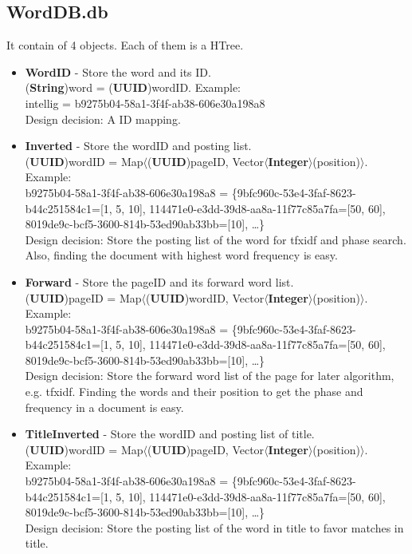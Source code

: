 \documentclass{article}
\begin{document}
    \subsection*{WordDB.db}
    It contain of 4 objects. Each of them is a HTree.
    \begin{itemize}
        \item \textbf{WordID} - Store the word and its ID. \\[0.4em]
        (\textbf{String})word = (\textbf{UUID})wordID. Example:\\[0.4em]
        intellig = b9275b04-58a1-3f4f-ab38-606e30a198a8 \\[0.4em]
        Design decision: A ID mapping.
        \item \textbf{Inverted} - Store the wordID and posting list. \\[0.4em]
        (\textbf{UUID})wordID = Map$\langle$(\textbf{UUID})pageID, Vector$\langle$\textbf{Integer}$\rangle$(position)$\rangle$.
        Example:\\[0.4em]
        b9275b04-58a1-3f4f-ab38-606e30a198a8 = \{9bfc960c-53e4-3faf-8623-b44c251584c1=[1, 5, 10], 114471e0-e3dd-39d8-aa8a-11f77c85a7fa=[50, 60], 8019de9c-bcf5-3600-814b-53ed90ab33bb=[10], \dots \}\\[0.4em]
        Design decision: Store the posting list of the word for tfxidf and phase search. Also, finding the document with highest word frequency is easy.
        \item \textbf{Forward} - Store the pageID and its forward word list. \\[0.4em]
        (\textbf{UUID})pageID = Map$\langle$(\textbf{UUID})wordID, Vector$\langle$\textbf{Integer}$\rangle$(position)$\rangle$.
        Example:\\[0.4em]
        b9275b04-58a1-3f4f-ab38-606e30a198a8 = \{9bfc960c-53e4-3faf-8623-b44c251584c1=[1, 5, 10], 114471e0-e3dd-39d8-aa8a-11f77c85a7fa=[50, 60], 8019de9c-bcf5-3600-814b-53ed90ab33bb=[10], \dots \}\\[0.4em]
        Design decision: Store the forward word list of the page for later algorithm, e.g. tfxidf. Finding the words and their position to get the phase and frequency in a document is easy.
        \item \textbf{TitleInverted} - Store the wordID and posting list of title. \\[0.4em]
        (\textbf{UUID})wordID = Map$\langle$(\textbf{UUID})pageID, Vector$\langle$\textbf{Integer}$\rangle$(position)$\rangle$.
        Example:\\[0.4em]
        b9275b04-58a1-3f4f-ab38-606e30a198a8 = \{9bfc960c-53e4-3faf-8623-b44c251584c1=[1, 5, 10], 114471e0-e3dd-39d8-aa8a-11f77c85a7fa=[50, 60], 8019de9c-bcf5-3600-814b-53ed90ab33bb=[10], \dots \}\\[0.4em]
        Design decision: Store the posting list of the word in title to favor matches in title.
    \end{itemize}
\end{document}
